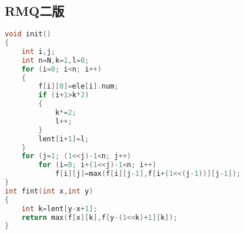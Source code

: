 \subsection{RMQ二版}
    \begin{lstlisting}[language=c++]
void init()
{
    int i,j;
    int n=N,k=1,l=0;
    for (i=0; i<n; i++)
    {
        f[i][0]=ele[i].num;
        if (i+1>k*2)
        {
            k*=2;
            l++;
        }
        lent[i+1]=l;
    }
    for (j=1; (1<<j)-1<n; j++)
        for (i=0; i+(1<<j)-1<n; i++)
            f[i][j]=max(f[i][j-1],f[i+(1<<(j-1))][j-1]);
}
int fint(int x,int y)
{
    int k=lent[y-x+1];
    return max(f[x][k],f[y-(1<<k)+1][k]);
}
    \end{lstlisting}
